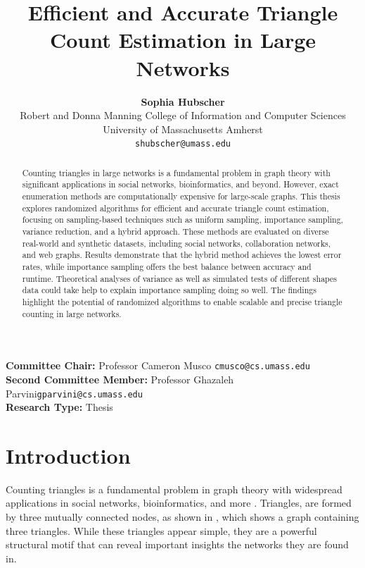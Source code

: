 \documentclass[11pt, margin=1in]{article}
\title{Efficient and Accurate Triangle Count Estimation in Large Networks}
\date{}
\author{
  \textbf{Sophia Hubscher}\\
  Robert and Donna Manning College of Information and Computer Sciences\\
  University of Massachusetts Amherst\\
  \texttt{shubscher@umass.edu}\\
}
\begin{document}
\maketitle

\vfill

\noindent\textbf{Committee Chair: }Professor Cameron Musco
\;\;\;\texttt{cmusco@cs.umass.edu} \\
\textbf{Second Committee Member: }Professor Ghazaleh Parvini\;\;\;\texttt{gparvini@cs.umass.edu} \\
\textbf{Research Type: } Thesis \\

\newpage

\begin{abstract}
Counting triangles in large networks is a fundamental problem in graph theory with significant applications in social networks, bioinformatics, and beyond.
However, exact enumeration methods are computationally expensive for large-scale graphs.
This thesis explores randomized algorithms for efficient and accurate triangle count estimation, focusing on sampling-based techniques such as uniform sampling, importance sampling, variance reduction, and a hybrid approach.
These methods are evaluated on diverse real-world and synthetic datasets, including social networks, collaboration networks, and web graphs.
Results demonstrate that the hybrid method achieves the lowest error rates, while importance sampling offers the best balance between accuracy and runtime.
Theoretical analyses of variance  as well as simulated tests of different shapes data could take help to explain importance sampling doing so well.
The findings highlight the potential of randomized algorithms to enable scalable and precise triangle counting in large networks.
\end{abstract}

\newpage

{
\singlespacing
\tableofcontents
}

\newpage

\section{Introduction}

Counting triangles is a fundamental problem in graph theory with widespread applications in social networks, bioinformatics, and more \cite{lovasz_large_2012}.
Triangles, are formed by three mutually connected nodes, as shown in , which shows a graph containing three triangles.
While these triangles appear simple, they are a powerful structural motif that can reveal important insights the networks they are found in.
\end{document}
